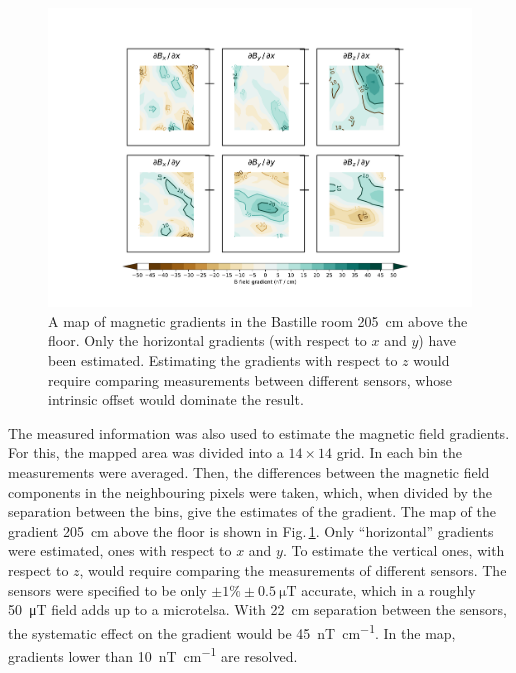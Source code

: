 \begin{figure}
  \centering
  \includegraphics[width=\linewidth]{gfx/mapping/lpsc/bastille_crane_away_rep_gradient_205cm_crop.pdf}
  \caption{A map of magnetic gradients in the Bastille room \SI{205}{\centi\metre} above the floor.
  Only the horizontal gradients (with respect to $x$ and $y$) have been estimated.
  Estimating the gradients with respect to $z$ would require comparing measurements between different sensors, whose intrinsic offset would dominate the result.}\label{fig:mapping_bastille_gradient}
\end{figure}

The measured information was also used to estimate the magnetic field gradients.
For this, the mapped area was divided into a $14 \times 14$ grid.
In each bin the measurements were averaged.
Then, the differences between the magnetic field components in the neighbouring pixels were taken, which, when divided by the separation between the bins, give the estimates of the gradient.
The map of the gradient \SI{205}{\centi\metre} above the floor is shown in Fig.\,\ref{fig:mapping_bastille_gradient}.
Only ``horizontal'' gradients were estimated, ones with respect to $x$ and $y$.
To estimate the vertical ones, with respect to $z$, would require comparing the measurements of different sensors.
The sensors were specified to be only $\pm 1\% \pm \SI{0.5}{\micro\tesla}$ accurate, which in a roughly \SI{50}{\micro\tesla} field adds up to a microtelsa.
With \SI{22}{\centi\meter} separation between the sensors, the systematic effect on the gradient would be \SI[per-mode=symbol]{45}{\nano\tesla\per\centi\meter}.
In the map, gradients lower than \SI[per-mode=symbol]{10}{\nano\tesla\per\centi\meter} are resolved.


